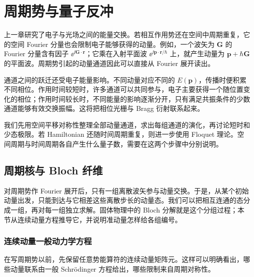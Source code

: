 \chapter{周期势与量子反冲}\label{chap:periodic-recoil}

上一章研究了电子与光场之间的能量交换。若相互作用势还在空间中周期重复，它的空间 Fourier 分量也会限制电子能够获得的动量。例如，一个波矢为 $\mathbf G$ 的 Fourier 分量含有因子 $\ee^{\ii\mathbf G\cdot\mathbf r}$；它乘在入射平面波 $\ee^{\ii\mathbf p\cdot\mathbf r/\hbar}$ 上，就产生动量为 $\mathbf p+\hbar\mathbf G$ 的平面波。周期势引起的动量通道因此可以直接从 Fourier 展开读出。

通道之间的跃迁还受电子能量影响。不同动量对应不同的 $E(\mathbf p)$，传播时便积累不同相位。作用时间较短时，许多通道可以共同参与，电子主要获得一个随位置变化的相位；作用时间较长时，不同能量的影响逐渐分开，只有满足共振条件的少数通道能够有效交换振幅。这将把相位光栅与 Bragg 衍射联系起来。\cite{Huang2023Recoil,KarnieliFan2023JC,Ruimy2025Perspective}

我们先用空间平移对称性整理全部动量通道，求出每组通道的演化，再讨论短时和少态极限。若 Hamiltonian 还随时间周期重复，则进一步使用 Floquet 理论。空间周期与时间周期各自产生什么量子数，需要在这两个步骤中分别说明。

\section{周期核与 Bloch 纤维}

对周期势作 Fourier 展开后，只有一组离散波矢参与动量交换。于是，从某个初始动量出发，只能到达与它相差这些离散步长的动量态。我们可以把相互连通的态分成一组，再对每一组独立求解。固体物理中的 Bloch 分解就是这个分组过程；本节从连续动量方程推导它，并说明准动量怎样给各组编号。

\subsection{连续动量一般动力学方程}

在写周期势以前，先保留任意势能算符的连续动量矩阵元。这样可以明确看出，哪些动量联系由一般 Schr\"odinger 方程给出，哪些限制来自周期对称性。

